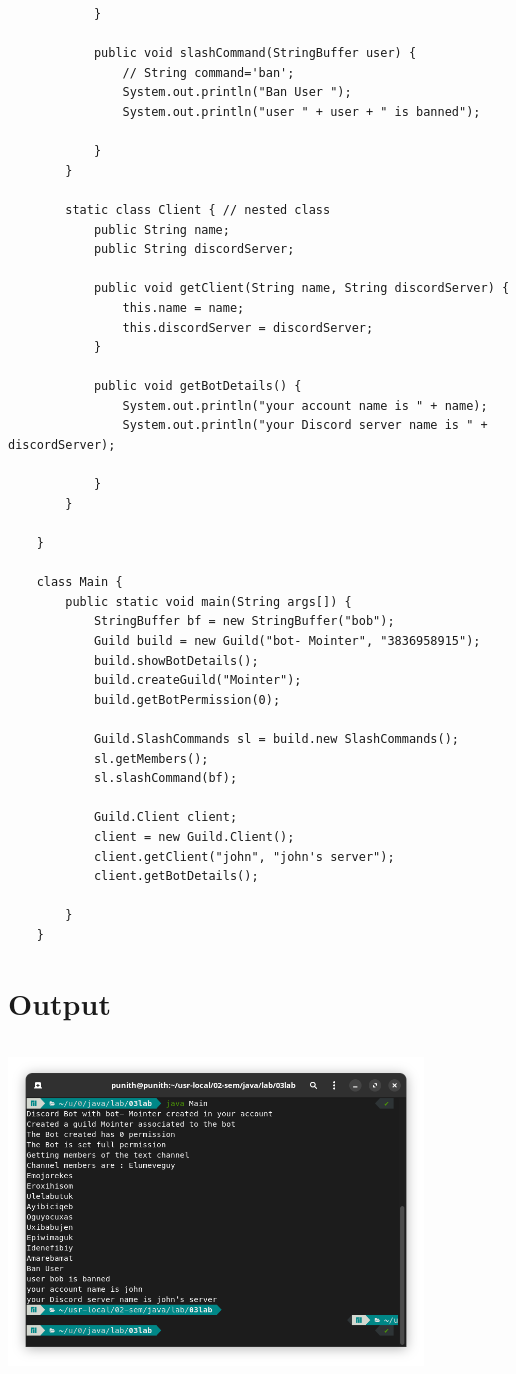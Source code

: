 \documentclass{article}
\begin{document}
\begin{lstlisting}
            }
    
            public void slashCommand(StringBuffer user) {
                // String command='ban';
                System.out.println("Ban User ");
                System.out.println("user " + user + " is banned");
    
            }
        }
    
        static class Client { // nested class
            public String name;
            public String discordServer;
    
            public void getClient(String name, String discordServer) {
                this.name = name;
                this.discordServer = discordServer;
            }
    
            public void getBotDetails() {
                System.out.println("your account name is " + name);
                System.out.println("your Discord server name is " + discordServer);
    
            }
        }
    
    }
    
    class Main {
        public static void main(String args[]) {
            StringBuffer bf = new StringBuffer("bob");
            Guild build = new Guild("bot- Mointer", "3836958915");
            build.showBotDetails();
            build.createGuild("Mointer");
            build.getBotPermission(0);
    
            Guild.SlashCommands sl = build.new SlashCommands();
            sl.getMembers();
            sl.slashCommand(bf);
    
            Guild.Client client;
            client = new Guild.Client();
            client.getClient("john", "john's server");
            client.getBotDetails();
    
        }
    }
\end{lstlisting}

\section*{Output}
\includegraphics[width=11cm, height=9cm]{./images/01.png}
\end{document}
